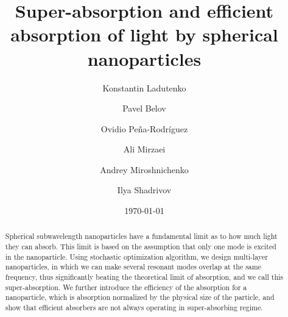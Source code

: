 \documentclass[aps,prl,twocolumn,showpacs,superscriptaddress,groupedaddress]{revtex4-1}
\begin{document}

\title{Super-absorption and efficient absorption of light by spherical
  nanoparticles}


\author{Konstantin Ladutenko} 


\author{Pavel Belov} 

\author{Ovidio Pe\~{n}a-Rodr\'{i}guez} 

\author{Ali Mirzaei} \author{Andrey Miroshnichenko} \author{Ilya
  Shadrivov} 

\date{\today}

\begin{abstract}
  Spherical subwavelength nanoparticles have a fundamental limit as to
  how much light they can absorb. This limit is based on the
  assumption that only one mode is excited in the nanoparticle. Using
  stochastic optimization algorithm, we design multi-layer nanoparticles, in which we
  can make several resonant modes overlap at the same frequency, thus
  significantly beating the theoretical limit of absorption, and we
  call this super-absorption. We further introduce the efficiency of
  the absorption for a nanoparticle, which is absorption normalized by
  the physical size of the particle, and show that efficient absorbers
  are not always operating in super-absorbing regime.
\end{abstract}
\end{document}
